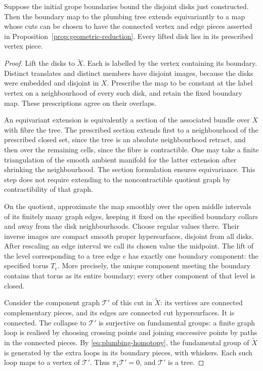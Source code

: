 \begin{lemma}
\label{lem:connected-tree-cuts}
Suppose the initial grope boundaries bound the disjoint disks just
constructed. Then the boundary map to the plumbing tree extends
equivariantly to a map whose cuts can be chosen to have the connected
vertex and edge pieces asserted in
Proposition~\ref{prop:geometric-reduction}. Every lifted disk lies in
its prescribed vertex piece.
\end{lemma}

\begin{proof}
Lift the disks to \(\widetilde X\). Each is labelled by the vertex
containing its boundary. Distinct translates and distinct members have
disjoint images, because the disks were embedded and disjoint in \(X\).
Prescribe the map to be constant at the label vertex on a neighbourhood
of every such disk, and retain the fixed boundary map. These prescriptions
agree on their overlaps.

An equivariant extension is equivalently a section of the associated
bundle over \(X\) with fibre the tree. The prescribed section extends first
to a neighbourhood of the prescribed closed set, since the tree is an
absolute neighbourhood retract, and then over the remaining cells,
since the fibre is contractible. One may take a finite triangulation of
the smooth ambient manifold for the latter extension after shrinking the
neighbourhood. The section formulation ensures equivariance. This step
does not require extending to the noncontractible quotient graph by
contractibility of that graph.

On the quotient, approximate the map smoothly over the open middle
intervals of its finitely many graph edges, keeping it fixed on the
specified boundary collars and away from the disk neighbourhoods.
Choose regular values there. Their inverse images are compact smooth
proper hypersurfaces, disjoint from all disks. After rescaling an edge
interval we call its chosen value the midpoint. The lift of the level
corresponding to a tree edge \(e\) has exactly one boundary component:
the specified torus \(T_e\). More precisely, the unique component meeting
the boundary contains that torus as its entire boundary; every other
component of that level is closed.

Consider the component graph \(\mathcal T'\) of this cut in
\(\widetilde X\): its vertices are connected complementary pieces, and
its edges are connected cut hypersurfaces. It is connected. The collapse
to \(\mathcal T'\) is surjective on fundamental groups: a finite graph
loop is realised by choosing crossing points and joining successive
points by paths in the connected pieces. By
\eqref{eq:plumbing-homotopy}, the fundamental group of \(\widetilde X\)
is generated by the extra loops in its boundary pieces, with whiskers.
Each such loop maps to a vertex of \(\mathcal T'\). Thus
\(\pi_1\mathcal T'=0\), and \(\mathcal T'\) is a tree.


\end{proof}
